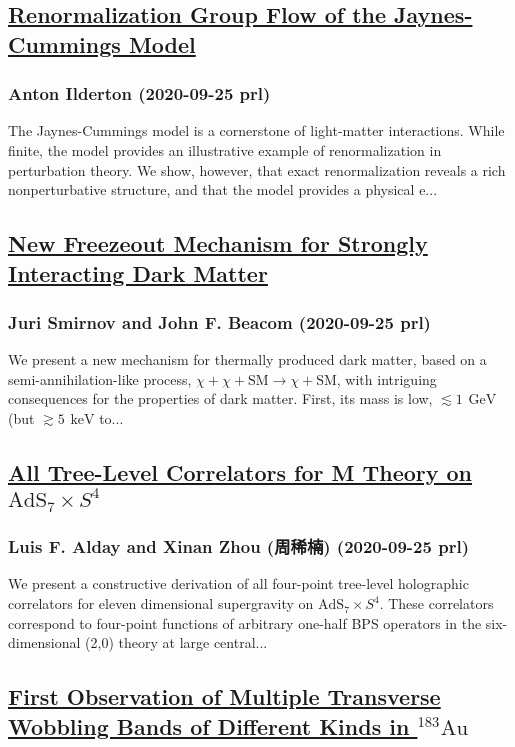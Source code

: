 \subsection*{\href{http://link.aps.org/doi/10.1103/PhysRevLett.125.130402}{Renormalization Group Flow of the Jaynes-Cummings Model}}
\subsubsection*{Anton Ilderton (2020-09-25 prl)}
The Jaynes-Cummings model is a cornerstone of light-matter interactions. While finite, the model provides an illustrative example of renormalization in perturbation theory. We show, however, that exact renormalization reveals a rich nonperturbative structure, and that the model provides a physical e...
\subsection*{\href{http://link.aps.org/doi/10.1103/PhysRevLett.125.131301}{New Freezeout Mechanism for Strongly Interacting Dark Matter}}
\subsubsection*{Juri Smirnov and John F. Beacom (2020-09-25 prl)}
We present a new mechanism for thermally produced dark matter, based on a semi-annihilation-like process, $χ+χ+\mathrm{SM}→χ+\mathrm{SM}$, with intriguing consequences for the properties of dark matter. First, its mass is low, $≲1\text{ }\text{ }\mathrm{GeV}$ (but $≳5\text{ }\text{ }\mathrm{keV}$ to...
\subsection*{\href{http://link.aps.org/doi/10.1103/PhysRevLett.125.131604}{All Tree-Level Correlators for M Theory on ${\mathrm{AdS}}_{7}×{S}^{4}$}}
\subsubsection*{Luis F. Alday and Xinan Zhou (周稀楠) (2020-09-25 prl)}
We present a constructive derivation of all four-point tree-level holographic correlators for eleven dimensional supergravity on ${\mathrm{AdS}}_{7}×{S}^{4}$. These correlators correspond to four-point functions of arbitrary one-half BPS operators in the six-dimensional (2,0) theory at large central...
\subsection*{\href{http://link.aps.org/doi/10.1103/PhysRevLett.125.132501}{First Observation of Multiple Transverse Wobbling Bands of Different Kinds in $^{183}\mathrm{Au}$}}
